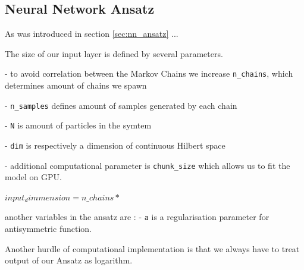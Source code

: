 \documentclass[a4paper,11pt,twoside]{article}
\begin{document}
\subsection{Neural Network Ansatz}

As was introduced in section \ref{sec:nn_ansatz} ...

The size of our input layer is defined by several parameters. 

- to avoid correlation between the Markov Chains we increase \texttt{n\_chains}, which determines amount of chains we spawn 

- \texttt{n\_samples} defines amount of samples generated by each chain

- \texttt{N} is amount of particles in the symtem

- \texttt{dim} is respectively a dimension of continuous Hilbert space 

- additional computational parameter is \texttt{chunk\_size} which allows us to fit the model on GPU. 

$ input_dimmension = n\_chains *  $

another variables in the ansatz are : 
- \texttt{a} is a regularisation parameter for antisymmetric function. 

Another hurdle of computational implementation is that we always have to treat output of our Ansatz as logarithm.  


 


\newpage
\end{document}
